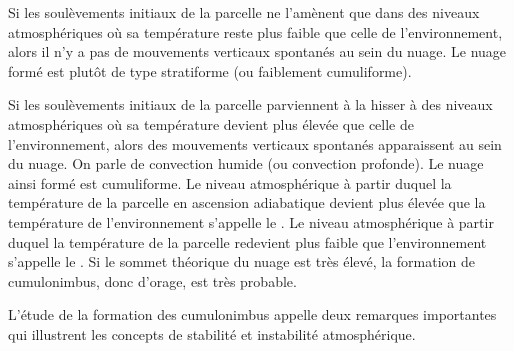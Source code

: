 \begin{finger}

\item Si les soulèvements initiaux de la parcelle ne l'amènent que dans des niveaux atmosphériques où sa température reste plus faible que celle de l'environnement, alors il n'y a pas de mouvements verticaux spontanés au sein du nuage. Le nuage formé est plutôt de type stratiforme (ou faiblement cumuliforme).

\item Si les soulèvements initiaux de la parcelle parviennent à la hisser à des niveaux atmosphériques où sa température devient plus élevée que celle de l'environnement, alors des mouvements verticaux spontanés apparaissent au sein du nuage. On parle de convection humide (ou convection profonde). Le nuage ainsi formé est cumuliforme. Le niveau atmosphérique à partir duquel la température de la parcelle en ascension adiabatique devient plus élevée que la température de l'environnement s'appelle le . Le niveau atmosphérique à partir duquel la température de la parcelle redevient plus faible que l'environnement s'appelle le . Si le sommet théorique du nuage est très élevé, la formation de cumulonimbus, donc d'orage, est très probable. 

\end{finger}

\sk
L'étude de la formation des cumulonimbus appelle deux remarques importantes qui illustrent les concepts de stabilité et instabilité atmosphérique.

